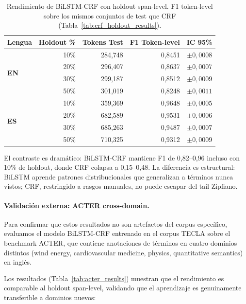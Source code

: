\begin{table}[H]
\centering
\small
\caption{Rendimiento de BiLSTM-CRF con holdout span-level. F1 token-level sobre los mismos conjuntos de test que CRF (Tabla~\ref{tab:crf_holdout_results}).}
\label{tab:bilstm_holdout_results}
\begin{tabular}{@{} l r r r r @{}}
\toprule
\textbf{Lengua} & \textbf{Holdout \%} & \textbf{Tokens Test} & \textbf{F1 Token-level} & \textbf{IC 95\%} \\
\midrule
\multirow{4}{*}{\textbf{EN}} & 10\% & 284{,}748 & 0{,}8451 & $\pm 0{,}0008$ \\
 & 20\% & 296{,}407 & 0{,}8637 & $\pm 0{,}0007$ \\
 & 30\% & 299{,}187 & 0{,}8512 & $\pm 0{,}0009$ \\
 & 50\% & 301{,}019 & 0{,}8248 & $\pm 0{,}0011$ \\
\midrule
\multirow{4}{*}{\textbf{ES}} & 10\% & 359{,}369 & 0{,}9648 & $\pm 0{,}0005$ \\
 & 20\% & 682{,}589 & 0{,}9531 & $\pm 0{,}0006$ \\
 & 30\% & 685{,}263 & 0{,}9487 & $\pm 0{,}0007$ \\
 & 50\% & 710{,}325 & 0{,}9312 & $\pm 0{,}0009$ \\
\bottomrule
\end{tabular}
\end{table}

El contraste es dramático: BiLSTM-CRF mantiene F1 de 0{,}82--0{,}96 incluso con 10\% de holdout, donde CRF colapsa a 0{,}15--0{,}48. La diferencia es estructural: BiLSTM aprende patrones distribucionales que generalizan a términos nunca vistos; CRF, restringido a rasgos manuales, no puede escapar del tail Zipfiano.

\paragraph{Validación externa: ACTER cross-domain.}
Para confirmar que estos resultados no son artefactos del corpus específico, evaluamos el modelo BiLSTM-CRF entrenado en el corpus TECLA sobre el benchmark ACTER, que contiene anotaciones de términos en cuatro dominios distintos (wind energy, cardiovascular medicine, physics, quantitative semantics) en inglés.

Los resultados (Tabla~\ref{tab:acter_results}) muestran que el rendimiento es comparable al holdout span-level, validando que el aprendizaje es genuinamente transferible a dominios nuevos:

